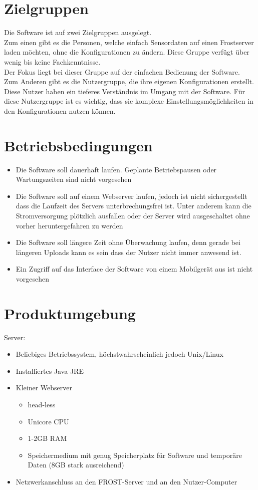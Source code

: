 \documentclass[a4paper, 12 pt]{article}
\begin{document}
	
	\section{Zielgruppen}
	Die Software ist auf zwei Zielgruppen ausgelegt.\\
	Zum einen gibt es die Personen, welche einfach Sensordaten auf einen Frostserver laden möchten, ohne die Konfigurationen zu ändern. Diese Gruppe verfügt über wenig bis keine Fachkenntnisse. \\Der Fokus liegt bei dieser Gruppe auf der einfachen Bedienung der Software.\\
	Zum Anderen gibt es die Nutzergruppe, die ihre eigenen Konfigurationen erstellt. Diese Nutzer haben ein tieferes Verständnis im Umgang mit der Software. Für diese Nutzergruppe ist es wichtig, dass sie komplexe Einstellungsmöglichkeiten in den Konfigurationen nutzen können.
	
\section{Betriebsbedingungen}
\begin{itemize}
	\item Die Software soll dauerhaft laufen. Geplante Betriebspausen oder Wartungszeiten sind nicht vorgesehen
	\item Die Software soll auf einem Webserver laufen, jedoch ist nicht sichergestellt dass die Laufzeit des Servers unterbrechungsfrei ist. Unter anderem kann die Stromversorgung plötzlich ausfallen oder der Server wird ausgeschaltet ohne vorher heruntergefahren zu werden
	\item Die Software soll längere Zeit ohne Überwachung laufen, denn gerade bei längeren Uploads kann es sein dass der Nutzer nicht immer anwesend ist.
	\item Ein Zugriff auf das Interface der Software von einem Mobilgerät aus ist nicht vorgesehen
\end{itemize}
	
\section{Produktumgebung}
Server:
\begin{itemize}
	\item Beliebiges Betriebssystem, höchstwahrscheinlich jedoch Unix/Linux
	\item Installiertes Java JRE
	\item Kleiner Webserver
	\begin{itemize}
		\item head-less
		\item Unicore CPU
		\item 1-2GB RAM
		\item Speichermedium mit genug Speicherplatz für Software und temporäre Daten (8GB stark ausreichend)
	\end{itemize}
	\item Netzwerkanschluss an den FROST-Server und an den Nutzer-Computer
\end{itemize}
\end{document}
